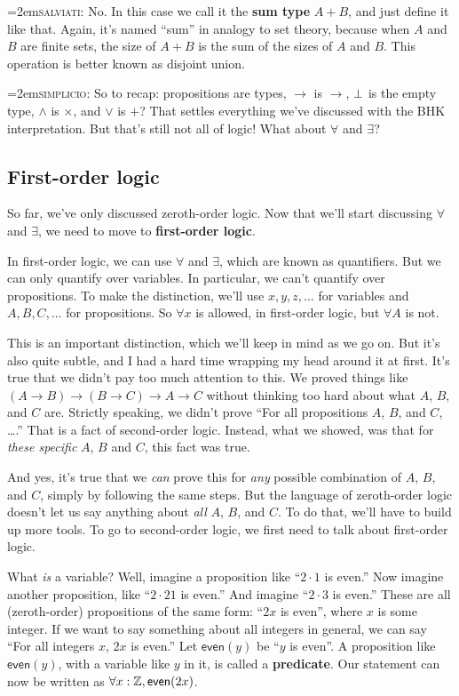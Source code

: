 \documentclass[11pt,paper=letter]{scrartcl}
\newcommand{\sf}{\mathsf}
\renewcommand{\land}{\wedge}
\renewcommand{\lor}{\vee}
\newcommand{\simp}{\vspace{0.5em}\noindent\hangindent=2em\textsc{simplicio:} }
\newcommand{\salv}{\vspace{0.5em}\noindent\hangindent=2em\textsc{salviati:} }
\begin{document}
\salv No. In this case we call it the \textbf{sum type} $A + B$, and just define it like that. Again, it's named ``sum'' in analogy to set theory, because when $A$ and $B$ are finite sets, the size of $A + B$ is the sum of the sizes of $A$ and $B$. This operation is better known as disjoint union.

\simp So to recap: propositions are types, $\to$ is $\to$, $\bot$ is the empty type, $\land$ is $\times$, and $\lor$ is $+$? That settles everything we've discussed with the BHK interpretation. But that's still not all of logic! What about $\forall$ and $\exists$?

\subsection{First-order logic}

So far, we've only discussed zeroth-order logic. Now that we'll start discussing $\forall$ and $\exists$, we need to move to \textbf{first-order logic}.

In first-order logic, we can use $\forall$ and $\exists$, which are known as quantifiers. But we can only quantify over variables. In particular, we can't quantify over propositions. To make the distinction, we'll use $x, y, z, \dots$ for variables and $A, B, C, \dots$ for propositions. So $\forall x$ is allowed, in first-order logic, but $\forall A$ is not.

This is an important distinction, which we'll keep in mind as we go on. But it's also quite subtle, and I had a hard time wrapping my head around it at first. It's true that we didn't pay too much attention to this. We proved things like $(A \to B) \to (B \to C) \to A \to C$ without thinking too hard about what $A$, $B$, and $C$ are. Strictly speaking, we didn't prove ``For all propositions $A$, $B$, and $C$, \dots.'' That is a fact of second-order logic. Instead, what we showed, was that for \emph{these specific} $A$, $B$ and $C$, this fact was true.

And yes, it's true that we \emph{can} prove this for \emph{any} possible combination of $A$, $B$, and $C$, simply by following the same steps. But the language of zeroth-order logic doesn't let us say anything about \emph{all} $A$, $B$, and $C$. To do that, we'll have to build up more tools. To go to second-order logic, we first need to talk about first-order logic.

What \emph{is} a variable? Well, imagine a proposition like ``$2\cdot1$ is even.'' Now imagine another proposition, like ``$2\cdot21$ is even.'' And imagine ``$2\cdot3$ is even.'' These are all (zeroth-order) propositions of the same form: ``$2x$ is even'', where $x$ is some integer. If we want to say something about all integers in general, we can say ``For all integers $x$, $2x$ is even.'' Let $\sf{even}(y)$ be ``$y$ is even''. A proposition like $\sf{even}(y)$, with a variable like $y$ in it, is called a \textbf{predicate}. Our statement can now be written as $\forall x: \ZZ, \sf{even}(2x)$.
\end{document}
